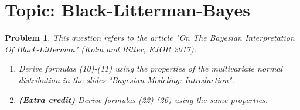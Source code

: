 \documentclass[11pt]{article}
\theoremstyle{plain} %
\newtheorem{problem}[theorem]{Problem}
\theoremstyle{remark}
\begin{document}
\section{Topic: Black-Litterman-Bayes}
\begin{problem}
This question refers to the article "On The Bayesian Interpretation Of
Black-Litterman" (Kolm and Ritter, EJOR 2017).
\begin{enumerate}[label=(\alph*)]
  \item Derive formulas (10)-(11) using the properties of the multivariate
        normal distribution in the slides "Bayesian Modeling: Introduction".
  \item \textbf{(Extra credit)} Derive formulas (22)-(26) using the same
        properties.
\end{enumerate}
\end{problem}
\end{document}
